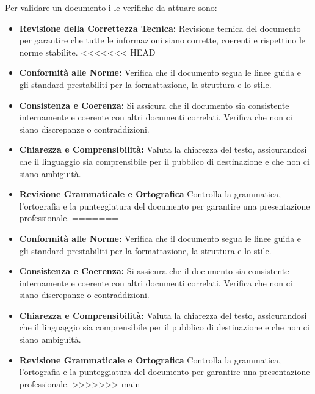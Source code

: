 \documentclass{article}
\begin{document}
Per validare un documento i le verifiche da attuare sono:
\begin{itemize}
    \item \textbf{Revisione della Correttezza Tecnica:} Revisione tecnica del documento per garantire che tutte le informazioni siano corrette, coerenti e rispettino le norme stabilite.
<<<<<<< HEAD
    \item \textbf{Conformità alle Norme:} Verifica che il documento segua le linee guida e gli standard prestabiliti per la formattazione, la struttura e lo stile.
    \item \textbf{Consistenza e Coerenza:} Si assicura che il documento sia consistente internamente e coerente con altri documenti correlati. Verifica che non ci siano discrepanze o contraddizioni.
    \item \textbf{Chiarezza e Comprensibilità:} Valuta la chiarezza del testo, assicurandosi che il linguaggio sia comprensibile per il pubblico di destinazione e che non ci siano ambiguità.
    \item \textbf{Revisione Grammaticale e Ortografica} Controlla la grammatica, l'ortografia e la punteggiatura del documento per garantire una presentazione professionale.
=======
     \item \textbf{Conformità alle Norme:} Verifica che il documento segua le linee guida e gli standard prestabiliti per la formattazione, la struttura e lo stile.
      \item \textbf{Consistenza e Coerenza:} Si assicura che il documento sia consistente internamente e coerente con altri documenti correlati. Verifica che non ci siano discrepanze o contraddizioni.
      \item \textbf{Chiarezza e Comprensibilità:} Valuta la chiarezza del testo, assicurandosi che il linguaggio sia comprensibile per il pubblico di destinazione e che non ci siano ambiguità.
      \item \textbf{Revisione Grammaticale e Ortografica} Controlla la grammatica, l'ortografia e la punteggiatura del documento per garantire una presentazione professionale.
>>>>>>> main
\end{itemize}
\end{document}
